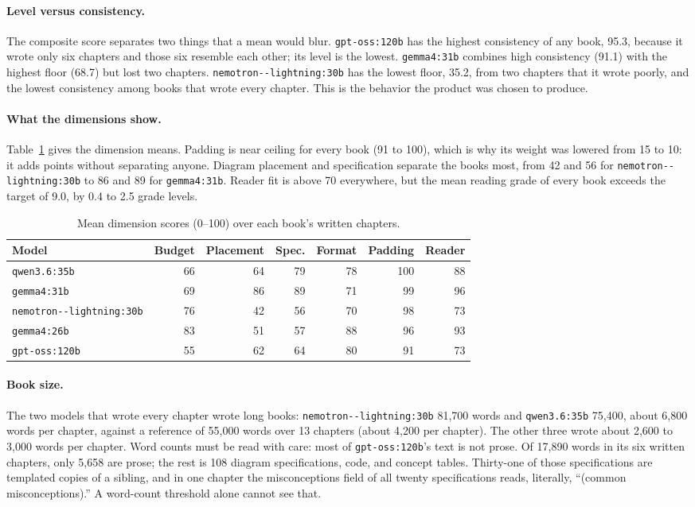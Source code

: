 \documentclass[11pt]{article}
\newcommand{\mdl}[1]{\texttt{#1}}
\newcommand{\Gthirtyone}{\mdl{gemma4:31b}}
\newcommand{\Qsix}{\mdl{qwen3.6:35b}}
\newcommand{\Gtwentysix}{\mdl{gemma4:26b}}
\newcommand{\Nemo}{\mdl{nemotron-\allowbreak 3.5-\allowbreak lightning:30b}}
\newcommand{\Gptoss}{\mdl{gpt-oss:120b}}
\begin{document}
\paragraph{Level versus consistency.}
The composite score separates two things that a mean would blur. \Gptoss{} has the highest consistency of any book, 95.3, because it wrote only six chapters and those six resemble each other; its level is the lowest. \Gthirtyone{} combines high consistency (91.1) with the highest floor (68.7) but lost two chapters. \Nemo{} has the lowest floor, 35.2, from two chapters that it wrote poorly, and the lowest consistency among books that wrote every chapter. This is the behavior the product was chosen to produce.

\paragraph{What the dimensions show.}
Table~\ref{tab:dims} gives the dimension means. Padding is near ceiling for every book (91 to 100), which is why its weight was lowered from 15 to 10: it adds points without separating anyone. Diagram placement and specification separate the books most, from 42 and 56 for \Nemo{} to 86 and 89 for \Gthirtyone. Reader fit is above 70 everywhere, but the mean reading grade of every book exceeds the target of 9.0, by 0.4 to 2.5 grade levels.

\begin{table}[htbp]
\centering
\small
\begin{tabular}{@{}lrrrrrr@{}}
\toprule
\textbf{Model} & \textbf{Budget} & \textbf{Placement} & \textbf{Spec.} & \textbf{Format} & \textbf{Padding} & \textbf{Reader} \\
\midrule
\Qsix & 66 & 64 & 79 & 78 & 100 & 88 \\
\Gthirtyone & 69 & 86 & 89 & 71 & 99 & 96 \\
\Nemo & 76 & 42 & 56 & 70 & 98 & 73 \\
\Gtwentysix & 83 & 51 & 57 & 88 & 96 & 93 \\
\Gptoss & 55 & 62 & 64 & 80 & 91 & 73 \\
\bottomrule
\end{tabular}
\caption{Mean dimension scores (0--100) over each book's written chapters.}
\label{tab:dims}
\end{table}

\paragraph{Book size.}
The two models that wrote every chapter wrote long books: \Nemo{} 81,700 words and \Qsix{} 75,400, about 6,800 words per chapter, against a reference of 55,000 words over 13 chapters (about 4,200 per chapter). The other three wrote about 2,600 to 3,000 words per chapter. Word counts must be read with care: most of \Gptoss's text is not prose. Of 17,890 words in its six written chapters, only 5,658 are prose; the rest is 108 diagram specifications, code, and concept tables. Thirty-one of those specifications are templated copies of a sibling, and in one chapter the misconceptions field of all twenty specifications reads, literally, ``(common misconceptions).'' A word-count threshold alone cannot see that.
\end{document}
